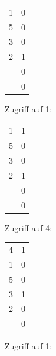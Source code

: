 \begin{enumerate}[a)]
\begin{solution}
\begin{minipage}{0.22\textwidth}
        \begin{tabular}{ | c | l}
            \cline{1-1}
            1   &   0   \\  \cline{1-1}
            5   &   0   \\  \cline{1-1}
            3   &   0   \\  \cline{1-1}
            2   &   1   \\  \cline{1-1}
                &   0   \\  \cline{1-1}
                &   0   \\  \cline{1-1}
        \end{tabular}
    \end{minipage}
    \begin{minipage}{0.22\textwidth}
        \center
        Zugriff auf 1:

        \begin{tabular}{ | c | l}
            \cline{1-1}
            1   &   1   \\  \cline{1-1}
            5   &   0   \\  \cline{1-1}
            3   &   0   \\  \cline{1-1}
            2   &   1   \\  \cline{1-1}
                &   0   \\  \cline{1-1}
                &   0   \\  \cline{1-1}
        \end{tabular}
    \end{minipage}
    \begin{minipage}{0.22\textwidth}
        \center
        Zugriff auf 4:

        \begin{tabular}{ | c | l}
            \cline{1-1}
            4   &   1   \\  \cline{1-1}
            1   &   0   \\  \cline{1-1}
            5   &   0   \\  \cline{1-1}
            3   &   1   \\  \cline{1-1}
            2   &   0   \\  \cline{1-1}
                &   0   \\  \cline{1-1}
        \end{tabular}
    \end{minipage}

    \begin{minipage}{0.28\textwidth}
        \center
        Zugriff auf 1:


\end{minipage}
\end{solution}
\end{enumerate}
